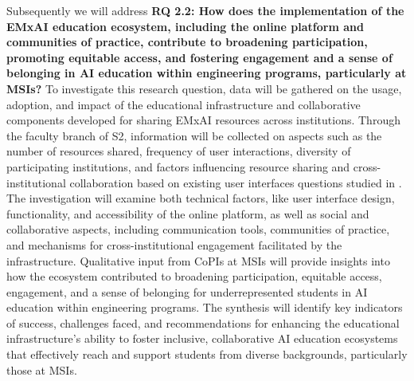 \documentclass[11pt]{article}
\begin{document}
Subsequently we will address \textbf{RQ 2.2: How does the implementation of the EMxAI education ecosystem, including the online platform and communities of practice, contribute to broadening participation, promoting equitable access, and fostering engagement and a sense of belonging in AI education within engineering programs, particularly at MSIs?} 
To investigate this research question, data will be gathered on the usage, adoption, and impact of the educational infrastructure and collaborative components developed for sharing EMxAI resources across institutions. 
Through the faculty branch of S2, information will be collected on aspects such as the number of resources shared, frequency of user interactions, diversity of participating institutions, and factors influencing resource sharing and cross-institutional collaboration based on existing user interfaces questions studied in \cite{stetson2004comparison}. 
The investigation will examine both technical factors, like user interface design, functionality, and accessibility of the online platform, as well as social and collaborative aspects, including communication tools, communities of practice, and mechanisms for cross-institutional engagement facilitated by the infrastructure. 
Qualitative input from CoPIs at MSIs will provide insights into how the ecosystem contributed to broadening participation, equitable access, engagement, and a sense of belonging for underrepresented students in AI education within engineering programs. 
The synthesis will identify key indicators of success, challenges faced, and recommendations for enhancing the educational infrastructure's ability to foster inclusive, collaborative AI education ecosystems that effectively reach and support students from diverse backgrounds, particularly those at MSIs.
\end{document}

